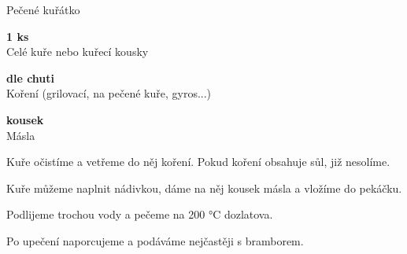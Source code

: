 \documentclass[11pt,a4paper]{article}
\begin{document}
\begin{recipe}[Tomato]{Pečené kuřátko}
    \begin{ingredients}
        \item \parbox[t]{\linewidth}{\raggedright \piece \textbf{1 ks}\\ Celé kuře nebo kuřecí kousky}
        \item \parbox[t]{\linewidth}{\raggedright \indefinite \textbf{dle chuti}\\ Koření (grilovací, na pečené kuře, gyros...)}
        \item \parbox[t]{\linewidth}{\raggedright \piece \textbf{kousek}\\ Másla}
    \end{ingredients}
    \begin{steps}
        \item Kuře očistíme a vetřeme do něj koření. Pokud koření obsahuje sůl, již nesolíme.
        \item Kuře můžeme naplnit nádivkou, dáme na něj kousek másla a vložíme do pekáčku.
        \item Podlijeme trochou vody a pečeme na 200 °C dozlatova.
        \item Po upečení naporcujeme a podáváme nejčastěji s bramborem.
    \end{steps}
\end{recipe}
\end{document}
